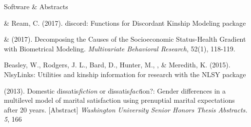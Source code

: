 \begin{rSection}{\textrm{Software \& Abstracts}}%
\begin{etaremune}
\item\meb \& Ream, C.  (2017). discord: Functions for Discordant Kinship Modeling \R package \href{https://CRAN.R-project.org/package=discord}{\color{blue}{https://CRAN.R-project.org/package=discord}}
\item\meb \& \joe (2017). Decomposing the Causes of the Socioeconomic Status-Health Gradient with Biometrical Modeling. \textit{Multivariate Behavioral Research}, 52(1), 118-119. \href{https://osf.io/xbkja/}{\color{blue}{https://osf.io/xbkja/}}
\item  Beasley, W., Rodgers, J. L., Bard, D., Hunter, M., \meb, \& Meredith, K. (2015). NlsyLinks: Utilities and kinship information for research with the NLSY \R package \href{https://cran.r-project.org/web/packages/NlsyLinks}{\color{blue}{https://cran.r-project.org/web/packages/NlsyLinks}}
\item\meb (2013). Domestic dissatis{\em fiction} or dissatis{\em fact}ion?: Gender differences in a multilevel model of marital satisfaction using prenuptial marital expectations after 20 years. [Abstract] {\em Washington University Senior Honors Thesis Abstracts. 5}, 166
\end{etaremune}
\end{rSection}